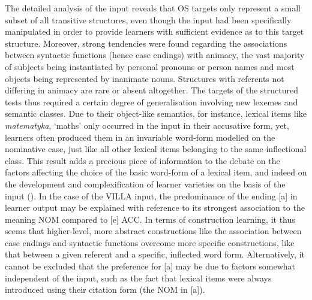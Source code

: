 The detailed analysis of the input reveals that OS targets only represent a small subset of all transitive structures, even though the input had been specifically manipulated in order to provide learners with sufficient evidence as to this target structure. Moreover, strong tendencies were found regarding the associations between syntactic functions (hence case endings) with animacy, the vast majority of subjects being instantiated by personal pronouns or person names and most objects being represented by inanimate nouns. Structures with referents not differing in animacy are rare or absent altogether. The targets of the structured tests thus required a certain degree of generalisation involving new lexemes and semantic classes. Due to their object-like semantics, for instance, lexical items like \textit{matematyka}, ‘maths’ only occurred in the input in their accusative form, yet, learners often produced them in an invariable word-form modelled on the nominative case, just like all other lexical items belonging to the same inflectional class. This result adds a precious piece of information to the debate on the factors affecting the choice of the basic word-form of a lexical item, and indeed on the development and complexification of learner varieties on the basis of the input (\citealt{Hulstijn2015}). In the case of the VILLA input, the predominance of the ending [a] in learner output may be explained with reference to its strongest association to the meaning NOM compared to [e] ACC. In terms of construction learning, it thus seems that higher-level, more abstract constructions like the association between case endings and syntactic functions overcome more specific constructions, like that between a given referent and a specific, inflected word form. Alternatively, it cannot be excluded that the preference for [a] may be due to factors somewhat independent of the input, such as the fact that lexical items were always introduced using their citation form (the NOM in [a]).

